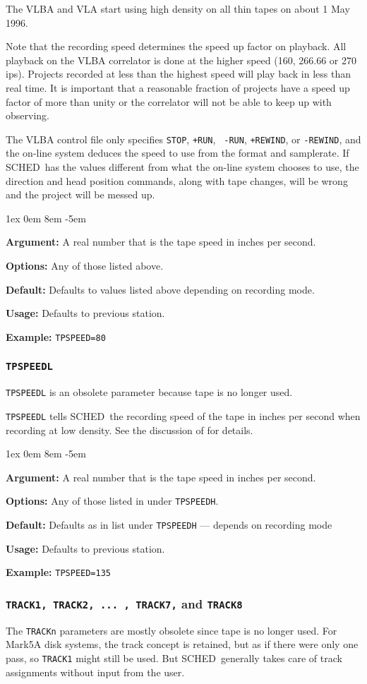 \documentclass{report}
\newcommand{\schedb}{{\sc SCHED~}}
\newcommand{\rcwbox}[5]{
  \begin{list}{}{\parsep 1ex  \itemsep 0em
                 \leftmargin 8em  \itemindent -5em }
    \item {\bf Argument:} #1
    \item {\bf Options:}  #2
    \item {\bf Default:}  #3
    \item {\bf Usage:}    #4
    \item {\bf Example:}  #5
  \end{list}
}
\begin{document}
The VLBA and VLA start using high density on all thin tapes on
about 1 May 1996.

Note that the recording speed determines the speed up factor on
playback.  All playback on the VLBA correlator is done at the higher
speed (160, 266.66 or 270 ips).  Projects recorded at less than the
highest speed will play back in less than real time.  It is important
that a reasonable fraction of projects have a speed up factor of more
than unity or the correlator will not be able to keep up with
observing.

The VLBA control file only specifies {\tt STOP}, {\tt +RUN}, {\tt
-RUN}, {\tt +REWIND}, or {\tt -REWIND}, and the on-line system deduces
the speed to use from the format and samplerate.  If \schedb has
the values different from what the on-line system chooses to use, the
direction and head position commands, along with tape changes, will be
wrong and the project will be messed up.


\rcwbox
{A real number that is the tape speed in inches per second.}
{Any of those listed above.}
{Defaults to values listed above depending on recording mode.}
{Defaults to previous station.}
{{\tt TPSPEED=80}}

\subsubsection{\label{SP:TPSPEEDL}{\tt TPSPEEDL}}

{\tt TPSPEEDL} is an obsolete parameter because tape is no longer used.

{\tt TPSPEEDL} tells \schedb the recording speed of the tape in inches
per second when recording at low density.  See the discussion of
 for details.

\rcwbox
{A real number that is the tape speed in inches per second.}
{Any of those listed in under {\tt TPSPEEDH}.}
{Defaults as in list under {\tt TPSPEEDH} --- depends on recording
mode}
{Defaults to previous station.}
{{\tt TPSPEED=135}}


\subsubsection{\label{SP:TRACK1}
{\tt TRACK1, TRACK2, ... , TRACK7,} and {\tt TRACK8}}

The {\tt TRACKn} parameters are mostly obsolete since tape is no
longer used.  For Mark5A disk systems, the track concept is retained,
but as if there were only one pass, so {\tt TRACK1} might still be
used.  But \schedb generally takes care of track assignments without
input from the user.
\end{document}
